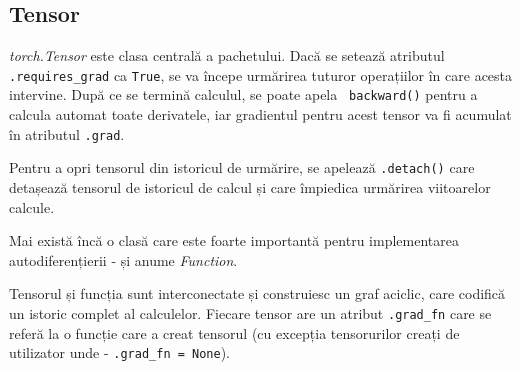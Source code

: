 \subsection{Tensor}

\textit{torch.Tensor} este clasa centrală a pachetului. Dacă se setează atributul \texttt{.requires\_grad} ca  \texttt{True}, se va începe urmărirea tuturor operațiilor în care acesta intervine. După ce se termină calculul, se poate apela \texttt{ backward()} pentru a calcula automat toate derivatele, iar gradientul pentru acest tensor va fi acumulat în atributul \texttt{.grad}.

Pentru a opri tensorul din istoricul de urmărire, se apelează \texttt{.detach()} care detașează tensorul de istoricul de calcul și care împiedica urmărirea viitoarelor calcule.

Mai există încă o clasă care este foarte importantă pentru implementarea autodiferențierii - și anume \textit{Function}.

Tensorul și funcția sunt interconectate și construiesc un graf aciclic, care codifică un istoric complet al calculelor. Fiecare tensor are un atribut  \texttt{.grad\_fn} care se referă la o funcție care a creat tensorul (cu excepția tensorurilor creați de utilizator unde - \texttt{.grad\_fn = None}).